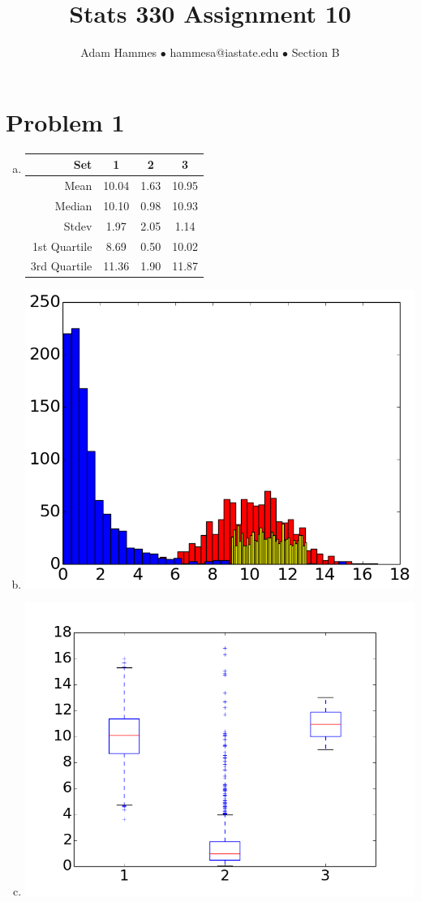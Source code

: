 \documentclass[11pt]{article}
\begin{document}
\title{\vspace{-8ex}Stats 330 Assignment 10}
\author{Adam Hammes $\bullet$ hammesa@iastate.edu $\bullet$ Section B}
\maketitle


\section*{Problem 1}

\begin{enumerate}[(a)]
\item
	\begin{tabular}{ r | c | c | c}
		Set & 1 & 2 & 3 \\
		\hline
		Mean & 10.04 & 1.63 & 10.95 \\
		\hline
		Median & 10.10 & 0.98 & 10.93 \\
		\hline
		Stdev & 1.97 & 2.05 & 1.14 \\
		\hline
		1st Quartile & 8.69 & 0.50 & 10.02 \\
		\hline
		3rd Quartile & 11.36 & 1.90 & 11.87
	\end{tabular}

\item {} {
	\includegraphics[scale = 0.7]{Histogram.png}
	}

\item {} {
	\includegraphics[scale = 0.7]{Boxplot.png}
	}


\end{enumerate}
\end{document}
